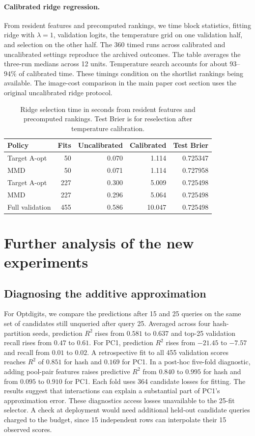 \documentclass{article}
\begin{document}
\paragraph{Calibrated ridge regression.}
From resident features and precomputed rankings, we time block statistics, fitting ridge with $\lambda=1$, validation logits, the temperature grid on one validation half, and selection on the other half. The 360 timed runs across calibrated and uncalibrated settings reproduce the archived outcomes. The table averages the three-run medians across 12 units. Temperature search accounts for about $93$--$94\%$ of calibrated time. These timings condition on the shortlist rankings being available. The image-cost comparison in the main paper cost section uses the original uncalibrated ridge protocol.

\begin{table}[ht]
\centering
\caption{Ridge selection time in seconds from resident features and precomputed rankings. Test Brier is for reselection after temperature calibration.}
\label{tab:ridge-server-timing}
\begin{tabular}{lrrrr}
\toprule
Policy & Fits & Uncalibrated & Calibrated & Test Brier \\
\midrule
Target A-opt & 50 & 0.070 & 1.114 & 0.725347 \\
MMD & 50 & 0.071 & 1.114 & 0.727958 \\
Target A-opt & 227 & 0.300 & 5.009 & 0.725498 \\
MMD & 227 & 0.296 & 5.064 & 0.725498 \\
Full validation & 455 & 0.586 & 10.047 & 0.725498 \\
\bottomrule
\end{tabular}
\end{table}

\section{Further analysis of the new experiments}

\subsection{Diagnosing the additive approximation}
For Optdigits, we compare the predictions after 15 and 25 queries on the same set of candidates still unqueried after query 25. Averaged across four hash-partition seeds, prediction $R^2$ rises from $0.581$ to $0.637$ and top-25 validation recall rises from $0.47$ to $0.61$. For PC1, prediction $R^2$ rises from $-21.45$ to $-7.57$ and recall from $0.01$ to $0.02$. A retrospective fit to all 455 validation scores reaches $R^2$ of $0.851$ for hash and $0.169$ for PC1. In a post-hoc five-fold diagnostic, adding pool-pair features raises predictive $R^2$ from $0.840$ to $0.995$ for hash and from $0.095$ to $0.910$ for PC1. Each fold uses 364 candidate losses for fitting. The results suggest that interactions can explain a substantial part of PC1's approximation error. These diagnostics access losses unavailable to the 25-fit selector. A check at deployment would need additional held-out candidate queries charged to the budget, since 15 independent rows can interpolate their 15 observed scores.
\end{document}
